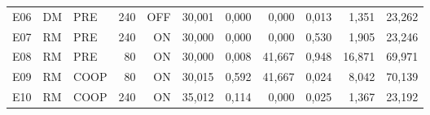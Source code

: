 \begin{singlespace}
\begin{longtable}{@{}lllrrrrrrrr@{}}
E06 & DM & PRE & 240 & OFF & 30{,}001 & 0{,}000 & 0{,}000 & 0{,}013 & 1{,}351 & 23{,}262\\
E07 & RM & PRE & 240 & ON & 30{,}000 & 0{,}000 & 0{,}000 & 0{,}530 & 1{,}905 & 23{,}246\\
E08 & RM & PRE & 80 & ON & 30{,}000 & 0{,}008 & 41{,}667 & 0{,}948 & 16{,}871 & 69{,}971\\
E09 & RM & COOP & 80 & ON & 30{,}015 & 0{,}592 & 41{,}667 & 0{,}024 & 8{,}042 & 70{,}139\\
E10 & RM & COOP & 240 & ON & 35{,}012 & 0{,}114 & 0{,}000 & 0{,}025 & 1{,}367 & 23{,}192\\
\end{longtable}
\endgroup
{}
\end{singlespace}
